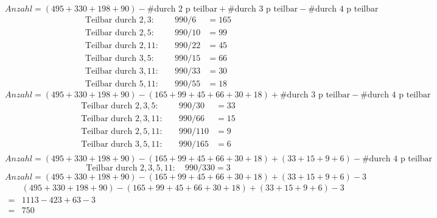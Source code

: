 \documentclass{article} %
\begin{document}
\begin{enumerate}
\begin{mybox}
       \[Anzahl = (495+330+198+90) - \text{\#durch 2 p teilbar} + \text{\#durch 3 p teilbar} - \text{\#durch 4 p teilbar}\]
       \begin{align*}
           \text{Teilbar durch } 2,3: & \quad 990 /6 &= 165 \\
           \text{Teilbar durch }2,5 : & \quad 990 / 10 &= 99 \\
           \text{Teilbar durch }2,11 : & \quad 990 / 22 &= 45 \\
           \text{Teilbar durch }3,5 : & \quad 990 /15 &=  66\\
           \text{Teilbar durch }3,11 : & \quad 990 / 33 &= 30\\
             \text{Teilbar durch } 5,11: & \quad 990 /55 &= 18
       \end{align*}
        \[Anzahl = (495+330+198+90) - (165+99+45+66+30+18)+ \text{\#durch 3 p teilbar} - \text{\#durch 4 p teilbar}\]
\begin{align*}
     \text{Teilbar durch } 2,3,5: & \quad 990 / 30 &= 33 \\
      \text{Teilbar durch }2,3,11 : & \quad 990 / 66 &= 15\\
       \text{Teilbar durch } 2,5,11: & \quad 990 / 110 &=  9 \\
        \text{Teilbar durch } 3,5,11: & \quad 990 / 165 &= 6 \\
\end{align*}
\[Anzahl = (495+330+198+90) - (165+99+45+66+30+18)+ (33+15+9+6) - \text{\#durch 4 p teilbar}\]
\[ \text{Teilbar durch } 2,3,5,11:  \quad 990 / 330 =3 \]
\[Anzahl = (495+330+198+90) - (165+99+45+66+30+18)+ (33+15+9+6) - 3\]
\begin{align*}
    & (495+330+198+90) - (165+99+45+66+30+18)+ (33+15+9+6) - 3 \\
    = & 1113 - 423 + 63 -3 \\
    = & 750
\end{align*}
        \end{mybox}
    \end{enumerate}
\end{document}
